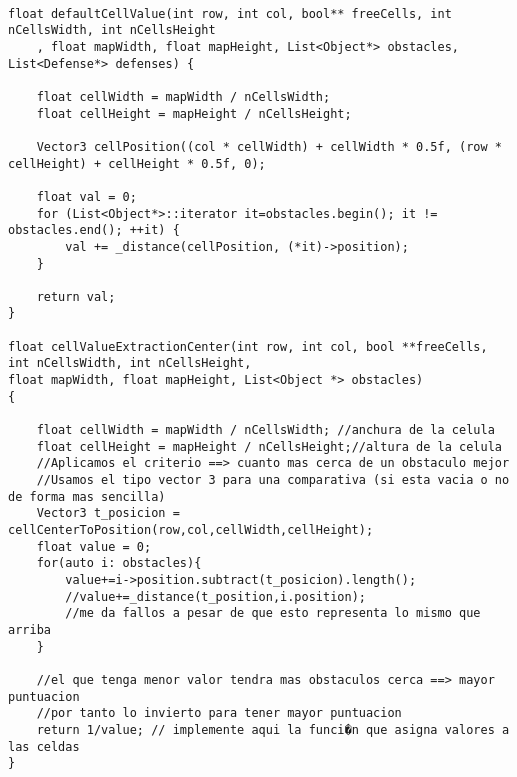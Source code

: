 
\begin{lstlisting}
    
float defaultCellValue(int row, int col, bool** freeCells, int nCellsWidth, int nCellsHeight
    , float mapWidth, float mapHeight, List<Object*> obstacles, List<Defense*> defenses) {
    	
    float cellWidth = mapWidth / nCellsWidth;
    float cellHeight = mapHeight / nCellsHeight;

    Vector3 cellPosition((col * cellWidth) + cellWidth * 0.5f, (row * cellHeight) + cellHeight * 0.5f, 0);
    	
    float val = 0;
    for (List<Object*>::iterator it=obstacles.begin(); it != obstacles.end(); ++it) {
	    val += _distance(cellPosition, (*it)->position);
    }

    return val;
}

float cellValueExtractionCenter(int row, int col, bool **freeCells, int nCellsWidth, int nCellsHeight, 
float mapWidth, float mapHeight, List<Object *> obstacles)
{
    
    float cellWidth = mapWidth / nCellsWidth; //anchura de la celula
    float cellHeight = mapHeight / nCellsHeight;//altura de la celula
    //Aplicamos el criterio ==> cuanto mas cerca de un obstaculo mejor 
    //Usamos el tipo vector 3 para una comparativa (si esta vacia o no de forma mas sencilla)
    Vector3 t_posicion = cellCenterToPosition(row,col,cellWidth,cellHeight);
    float value = 0;
    for(auto i: obstacles){
        value+=i->position.subtract(t_posicion).length();
        //value+=_distance(t_position,i.position); 
        //me da fallos a pesar de que esto representa lo mismo que arriba
    }
    
    //el que tenga menor valor tendra mas obstaculos cerca ==> mayor puntuacion
    //por tanto lo invierto para tener mayor puntuacion
    return 1/value; // implemente aqui la funci�n que asigna valores a las celdas
}
\end{lstlisting}